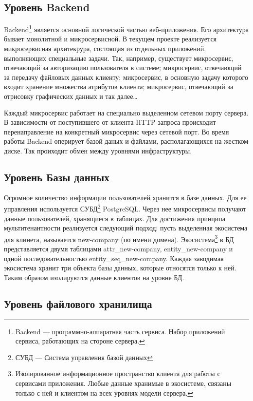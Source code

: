 \subsection{Уровень Backend}

Backend\footnote{Backend --- программно-аппаратная часть сервиса. Набор приложений сервиса, работающих на стороне сервера.} является основной логической частью веб-приложения. Его архитектура бывает монолитной и микросервисной. В текущем проекте реализуется микросервисная архитекрура, состоящая из отдельных приложений, выполняющих специальные задачи. Так, например, существует микросервис, отвечающий за авторизацию пользователя в системе; микросервис, отвечающий за передачу файловых данных клиенту; микросервис, в основную задачу которого входит хранение множества атрибутов клиента; микросервис, отвечающий за отрисовку графических данных и так далее\dots

Каждый микросервис работает на специально выделенном сетевом порту сервера. В зависимости от поступившего от клиента HTTP-запроса происходит перенаправление на конкретный микросервис через сетевой порт. Во время работы Backend оперирует базой даных и файлами, располагающихся на жестком диске. Так проиходит обмен между уровнями инфраструктуры.
 
\subsection{Уровень Базы данных}

Огромное количество информации пользователей хранится в базе данных. Для ее управления используется СУБД\footnote{СУБД --- Система управления базой данных} PostgreSQL. Через нее микросервисы получают данные пользователей, хранящиеся в таблицах. Для достижения принципа мультитенантности реализуется следующий подход: пусть выделенная экосистема для клинета, называется new-company (по имени домена). Экосистема\footnote{Изолированное информационное пространство клиента для работы с сервисами приложения. Любые данные хранимые в экосистеме, связаны только с ней и клиентом на всех уровнях модели сервера.} в БД представляется двумя таблицами {\ttfamily attr\_new-company}, {\ttfamily entity\_new-company} и одной последовательностью {\ttfamily entity\_seq\_new-company}. Каждая заводимая экосистема хранит три объекта базы данных, которые относятся только к ней. Таким образом изолируются данные клиентов на уровне БД.

\subsection{Уровень файлового хранилища}

